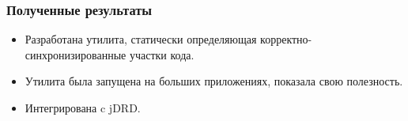 \documentclass[t]{beamer}  %
\begin{document}
\begin{frame}[fragile]

  \frametitle{Полученные результаты}
  \vspace{0.5cm}
\begin{itemize}
	\setlength\itemsep{1cm}
	\item Разработана утилита, статически определяющая корректно-синхронизированные участки кода.
	\item Утилита была запущена на больших приложениях, показала свою полезность.
	\item Интегрирована c jDRD.
\end{itemize}
\end{frame}
\end{document}
